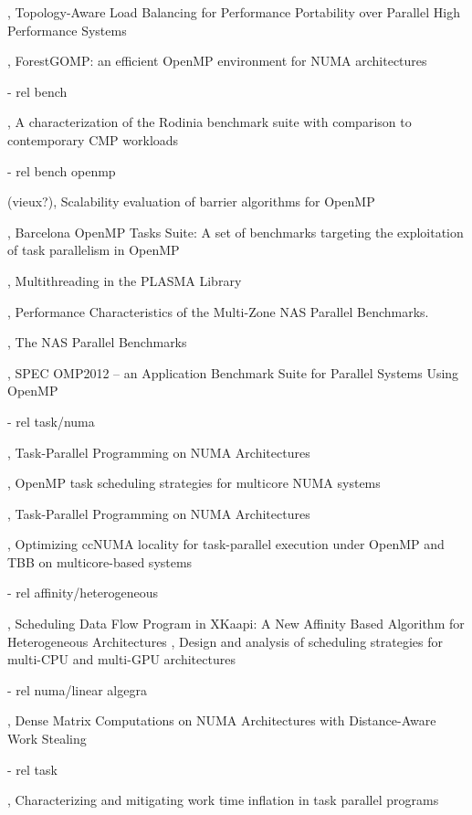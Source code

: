 \cite{Pilla2014}, Topology-Aware Load Balancing for Performance Portability over Parallel High Performance Systems

\cite{Broquedis2010a}, ForestGOMP: an efficient OpenMP environment for NUMA architectures

  - rel bench

\cite{Rodinia2010}, A characterization of the Rodinia benchmark suite with comparison to contemporary CMP workloads

  - rel bench openmp

(vieux?)\cite{Nanjegowda2009}, Scalability evaluation of barrier algorithms for OpenMP

\cite{Duran2009}, Barcelona OpenMP Tasks Suite: A set of benchmarks targeting the exploitation of task parallelism in OpenMP

\cite{Kurzak2013}, Multithreading in the PLASMA Library

\cite{Jin2004}, Performance Characteristics of the Multi-Zone NAS Parallel Benchmarks.

\cite{Bailey1994}, The NAS Parallel Benchmarks

\cite{Muller2012}, SPEC OMP2012 -- an Application Benchmark Suite for Parallel Systems Using OpenMP

  - rel task/numa

\cite{Wienke2012}, Task-Parallel Programming on NUMA Architectures

\cite{Olivier2012}, OpenMP task scheduling strategies for multicore NUMA systems

\cite{Terboven2012}, Task-Parallel Programming on NUMA Architectures

\cite{Wittmann2011}, Optimizing ccNUMA locality for task-parallel execution under OpenMP and TBB on multicore-based systems


  - rel affinity/heterogeneous

\cite{Bleuse2014}, Scheduling Data Flow Program in XKaapi: A New Affinity Based Algorithm for Heterogeneous Architectures
\cite{Lima2015}, Design and analysis of scheduling strategies for multi-CPU and multi-GPU architectures

  - rel numa/linear algegra

\cite{Al-Omairy2015}, Dense Matrix Computations on NUMA Architectures with Distance-Aware Work Stealing

  - rel task

\cite{Olivier2013}, Characterizing and mitigating work time inflation in task parallel programs

